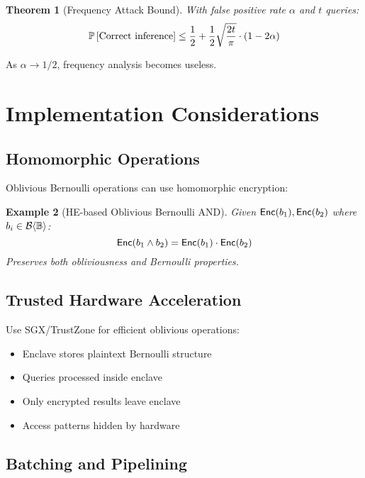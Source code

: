 \documentclass[11pt,final,hidelinks]{article}
\newcommand{\BernBool}{\mathcal{B}\langle \Bool \rangle}
\newcommand{\fprate}{\alpha}
\newtheorem{theorem}{Theorem}[section]
\newtheorem{example}[theorem]{Example}
\begin{document}
\begin{theorem}[Frequency Attack Bound]
With false positive rate $\fprate$ and $t$ queries:
\begin{equation}
\Prob{\text{Correct inference}} \leq \frac{1}{2} + \frac{1}{2}\sqrt{\frac{2t}{\pi}} \cdot (1 - 2\fprate)
\end{equation}
\end{theorem}

As $\fprate \to 1/2$, frequency analysis becomes useless.

\section{Implementation Considerations}

\subsection{Homomorphic Operations}

Oblivious Bernoulli operations can use homomorphic encryption:

\begin{example}[HE-based Oblivious Bernoulli AND]
Given $\mathsf{Enc}(b_1), \mathsf{Enc}(b_2)$ where $b_i \in \BernBool$:
\begin{equation}
\mathsf{Enc}(b_1 \land b_2) = \mathsf{Enc}(b_1) \cdot \mathsf{Enc}(b_2)
\end{equation}
Preserves both obliviousness and Bernoulli properties.
\end{example}

\subsection{Trusted Hardware Acceleration}

Use SGX/TrustZone for efficient oblivious operations:
\begin{itemize}
    \item Enclave stores plaintext Bernoulli structure
    \item Queries processed inside enclave
    \item Only encrypted results leave enclave
    \item Access patterns hidden by hardware
\end{itemize}

\subsection{Batching and Pipelining}
\end{document}
